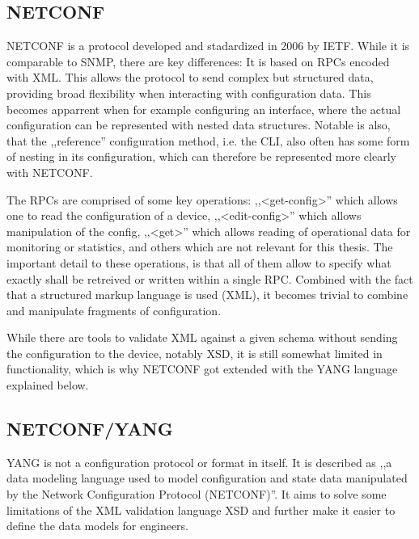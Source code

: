 \subsection{NETCONF}

NETCONF is a protocol developed and stadardized in 2006  by \acrshort{IETF}.
While it is comparable to SNMP, there are key differences:
It is based on \acrfull{RPC}s encoded with XML.
This allows the protocol to send complex but structured data, providing broad flexibility
when interacting with configuration data. 
This becomes apparrent when for example configuring an interface, where the actual configuration
can be represented with nested data structures.
Notable is also, that the ,,reference'' configuration method, i.e. the CLI, also often has some form
of nesting in its configuration, which can therefore be represented more clearly with NETCONF.

The \acrshort{RPC}s are comprised of some key operations: ,,<get-config>'' which allows one to read
the configuration of a device, ,,<edit-config>'' which allows manipulation of the config, ,,<get>''
which allows reading of operational data for monitoring or statistics, and others which are not
relevant for this thesis. 
The important detail to these operations, is that all of them allow to specify what exactly shall
be retreived or written within a single \acrshort{RPC}. Combined with the fact that a structured
markup language is used (XML), it becomes trivial to combine and manipulate fragments of configuration.

While there are tools to validate XML against a given schema without sending the configuration to the device,
notably \acrfull{XSD}, it is still somewhat limited in functionality, 
which is why NETCONF got extended with the YANG language explained below.

\subsection{NETCONF/YANG}

YANG is not a configuration protocol or format in itself.
It is described as ,,a data modeling language used to model configuration and
state data manipulated by the Network Configuration Protocol (NETCONF)''.
It aims to solve some limitations of the XML validation language XSD and further make it
easier to define the data models for engineers.


